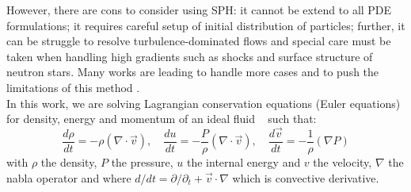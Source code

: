 However, there are cons to consider using SPH: 
it cannot be extend to all PDE formulations;
it requires careful setup of initial distribution of particles; 
further, it can be struggle to resolve turbulence-dominated flows and special care must be taken when handling high gradients such as shocks and surface structure of neutron stars.
Many works are leading to handle more cases and to push the limitations of this method \cite{dai2017dual,lind2016incompressible,ren2016dual}.\\

In this work, we are solving Lagrangian conservation equations (Euler equations) for density, energy and momentum of an ideal fluid ~\cite{Landau1959}  such that:
\begin{equation}
\frac{d \rho}{d t} = - \rho ( \nabla \cdot \vec{v}), \quad
\frac{d u}{d t} = - \frac{P}{\rho} ( \nabla \cdot \vec{v} ), \quad
\frac{d \vec{v}}{d t} = - \frac{1}{\rho} (\nabla P)
\end{equation}
with $\rho$ the density, $P$ the pressure, $u$ the internal energy and $v$ the velocity, $\nabla$ the nabla operator and where $d/dt = \partial/\partial_t + \vec{v} \cdot \nabla$ which is convective derivative.

